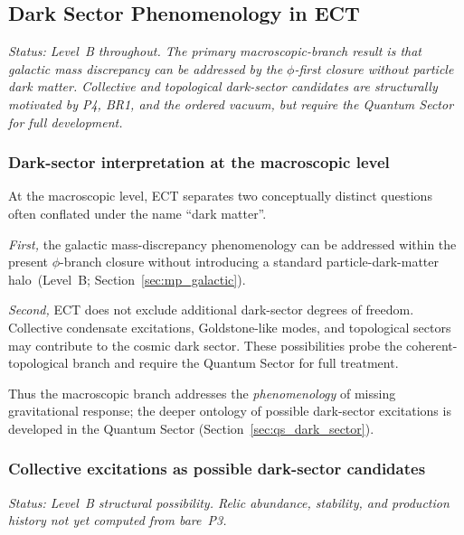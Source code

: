 \documentclass[11pt,a4paper]{article}
\numberwithin{equation}{section}
\begin{document}
\subsection{Dark Sector Phenomenology in ECT}
\label{sec:dark_sector}

\textit{Status: Level~B throughout. The primary macroscopic-branch
result is that galactic mass discrepancy can be addressed by the
$\phi$-first closure without particle dark matter. Collective and
topological dark-sector candidates are structurally motivated by
P4, BR1, and the ordered vacuum, but require the Quantum Sector for full development.}

\subsubsection*{Dark-sector interpretation at the macroscopic level}

At the macroscopic level, ECT separates two conceptually distinct
questions often conflated under the name ``dark matter''.

\textit{First,} the galactic mass-discrepancy phenomenology can be
addressed within the present $\phi$-branch closure without introducing
a standard particle-dark-matter halo~(Level~B;
Section~\ref{sec:mp_galactic}).

\textit{Second,} ECT does not exclude additional dark-sector degrees
of freedom. Collective condensate excitations, Goldstone-like modes,
and topological sectors may contribute to the cosmic dark sector.
These possibilities probe the coherent-topological branch and require
the Quantum Sector for full treatment.

Thus the macroscopic branch addresses the \emph{phenomenology} of
missing gravitational response; the deeper ontology of possible
dark-sector excitations is developed in the Quantum Sector
(Section~\ref{sec:qs_dark_sector}).

\subsubsection*{Collective excitations as possible dark-sector candidates}

\textit{Status: Level~B structural possibility. Relic abundance,
stability, and production history not yet computed from bare~P3.}
\end{document}
